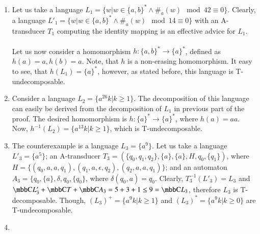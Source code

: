 \begin{enumerate}
\item Let us take a language $L_1 = \{w|w \in \{ a,b\}^* \wedge \#_{a}(w) \mod 42 \equiv 0 \}$. Clearly, a language $L'_1 = \{w|w \in \{ a,b\}^* \wedge \#_{a}(w) \mod 14 \equiv 0 \}$ with an A-transducer $T_1$ computing the identity mapping is an effective advice for $L_1$.

\paragraph{}
Let us now consider a homomorphism $h: \{ a,b\}^* \to \{ a \}^*$, defined as $h(a) = a, h(b) = a$. Note, that $h$ is a non-erasing homomorphism. It easy to see, that $h(L_1) = \{ a \}^*$, however, as stated before, this language is T-undecomposable.

\item Consider a language $L_2 = \{ a^26k | k \geq 1 \}$. The decomposition of this language can easily be derived from the decomposition of $L_1$ in previous part of the proof. The desired homomorphism is $h: \{a\}^* \to \{a\}^*$, where $h(a) = aa$. Now, $h^{-1}(L_2) = \{ a^13k | k \geq 1 \}$, which is T-undecomposable.

\item The counterexample is a language $L_3 = \{ a^{9} \}$. Let us take a language $L'_3 = \{ a^{5} \}$; an A-transducer $T_3 = (\{q_0, q_1, q_2\}, \{a\}, \{a\}, H, q_0, \{q_1\})$, where $H = \{ (q_0, a, a, q_1), (q_1, a, \epsilon, q_2), (q_2, a, a, q_1) \}$; and an automaton $A_3 = \{q_0, \{a\}, \delta, q_0, \{q_0\} $, where $\delta(q_0, a) = q_0$. Clearly, $T_3^{-1}(L'_3) = L_3$ and $\C{L'_3} + \C{T} + \C{A_3} = 5 + 3 + 1 \leq 9 = \C{L_3}$, therefore $L_3$ is T-decomposable. Though, $(L_3)^+ = \{ a^9k | k \geq 1 \}$ and $(L_3)^* = \{ a^9k | k \geq 0 \}$ are T-undecomposable.

\item
\end{enumerate}
\square
